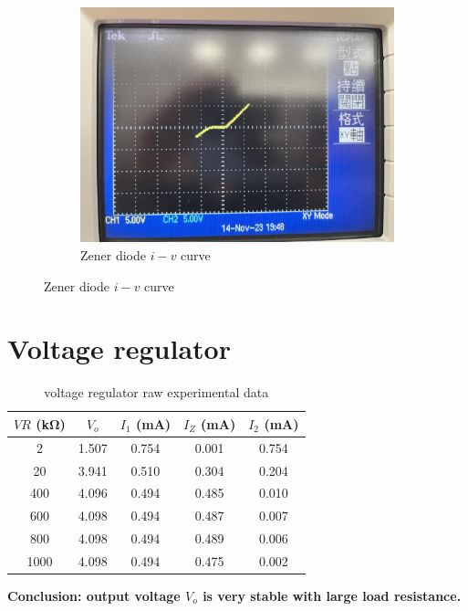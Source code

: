 \documentclass{article}
\begin{document}
\begin{CJK*}{UTF8}{bkai}
\begin{figure}[h]
\begin{center}
\begin{subfigure}[b]{0.3\textwidth}
            \includegraphics[width=\textwidth]{zener_xy.jpg}
            \caption{Zener diode $i-v$ curve}
        \end{subfigure}
    \end{center}   
    \end{figure}

\section{Voltage regulator}
\begin{table}[H]
    \begin{center}
    \begin{tabular}{|c|c|c|c|c|}
        \hline
        $VR$ (\unit{\kilo\ohm}) & $V_o$ & $I_1$ (\unit{\milli\ampere}) & $I_Z$ (\unit{\milli\ampere}) &  $I_2$ (\unit{\milli\ampere})\\
        \hline\hline
        2	 & 1.507 & 0.754 & 0.001 & 0.754 \\
        20   & 3.941 & 0.510 & 0.304 & 0.204 \\
        400	 & 4.096 & 0.494 & 0.485 & 0.010 \\
        600	 & 4.098 & 0.494 & 0.487 & 0.007 \\
        800	 & 4.098 & 0.494 & 0.489 & 0.006 \\
        1000 & 4.098 & 0.494 & 0.475 & 0.002 \\
     \hline
    \end{tabular}
    \caption{voltage regulator raw experimental data}
    \end{center}
\end{table}
\textbf{Conclusion: output voltage $V_o$ is very stable with large load resistance.}
\end{CJK*}
\end{document}

